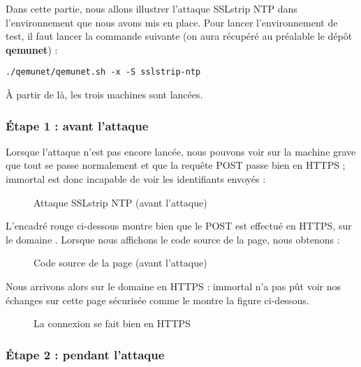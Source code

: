 Dans cette partie, nous allons illustrer l'attaque SSLstrip NTP dans l'environnement que nous avons mis en place. Pour lancer l'environnement de test, il faut lancer la commande suivante (on aura récupéré au préalable le dépôt \textbf{qemunet}) :

\begin{verbatim}
./qemunet/qemunet.sh -x -S sslstrip-ntp
\end{verbatim}

À partir de là, les trois machines sont lancées.

\subsubsection{Étape 1 : avant l'attaque}

Lorsque l'attaque n'est pas encore lancée, nous pouvons voir sur la machine grave que tout se passe normalement et que la requête POST passe bien en HTTPS ; immortal est donc incapable de voir les identifiants envoyés :

\begin{figure}[H]
  \caption{Attaque SSLstrip NTP (avant l'attaque)}
\end{figure}


L'encadré rouge ci-dessous montre bien que le POST est effectué en HTTPS, sur le domaine . Lorsque nous affichons le code source de la page, nous obtenons :

\begin{figure}[H]
  \caption{Code source de la page (avant l'attaque)}
\end{figure}

Nous arrivons alors sur le domaine  en HTTPS : immortal n'a pas pût voir nos échanges sur cette page sécurisée comme le montre la figure ci-dessous.

\begin{figure}[H]
  \caption{La connexion se fait bien en HTTPS}
\end{figure}

\subsubsection{Étape 2 : pendant l'attaque}

